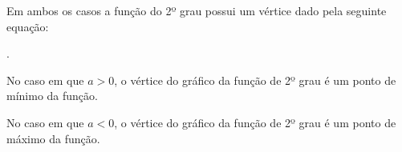\begin{itemize}
 Em ambos os casos a função do 2º grau possui um vértice dado pela seguinte equação:

 .

 No caso em que $a > 0$, o vértice do gráfico da função de 2º grau é um ponto de mínimo da função.

 No caso em que $a < 0$, o vértice do gráfico da função de 2º grau é um ponto de máximo da função.


  \begin{figure}[H]
  \end{figure}


\end{itemize}
